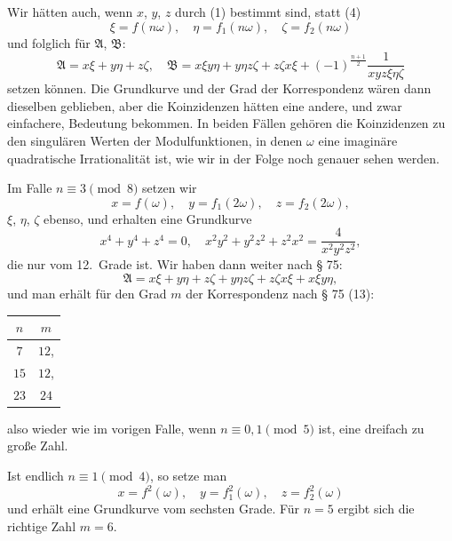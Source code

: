 \documentclass[12pt,a4paper]{article}
\theoremstyle{definition}
\begin{document}
Wir h\"atten auch, wenn $x$, $y$, $z$ durch (1) bestimmt sind,
statt (4)
\begin{equation}\tag{6}
\xi = f(n\omega), \quad \eta = f_1(n\omega), \quad \zeta = f_2(n\omega)
\end{equation}
und folglich f\"ur $\mathfrak{A}$, $\mathfrak{B}$:
\begin{equation}\tag{7}
\mathfrak{A} = x\xi + y\eta + z\zeta, \quad
\mathfrak{B} = x\xi y\eta + y\eta z\zeta + z\zeta x\xi + (-1)^{\frac{n+1}{2}} \frac{1}{xyz\xi\eta\zeta}
\end{equation}
setzen k\"onnen. Die Grundkurve und der Grad der Korrespondenz
w\"aren dann dieselben geblieben, aber die Koinzidenzen h\"atten
eine andere, und zwar einfachere, Bedeutung bekommen. In
beiden F\"allen geh\"oren die Koinzidenzen zu den singul\"aren Werten
der Modulfunktionen, in denen $\omega$ eine imagin\"are quadratische
Irrationalit\"at ist, wie wir in der Folge noch genauer sehen
werden.

Im Falle $n \equiv 3 \pmod{8}$ setzen wir
\begin{equation}\tag{8}
x = f(\omega), \quad y = f_1(2\omega), \quad z = f_2(2\omega),
\end{equation}
$\xi$, $\eta$, $\zeta$ ebenso, und erhalten eine Grundkurve
\begin{equation}\tag{9}
x^4 + y^4 + z^4 = 0, \quad x^2 y^2 + y^2 z^2 + z^2 x^2 = \frac{4}{x^2 y^2 z^2},
\end{equation}
die nur vom 12.~Grade ist. Wir haben dann weiter nach \S{} 75:
\begin{equation*}
\mathfrak{A} = x\xi + y\eta + z\zeta + y\eta z\zeta + z\zeta x\xi + x\xi y\eta,
\end{equation*}
und man erh\"alt f\"ur den Grad $m$ der Korrespondenz nach
\S{} 75 (13):
\begin{center}
\begin{tabular}{c|c}
$n$ & $m$ \\
\hline
$7$ & $12$, \\
$15$ & $12$, \\
$23$ & $24$ \\
\end{tabular}
\end{center}
also wieder wie im vorigen Falle, wenn $n \equiv 0, 1 \pmod{5}$ ist,
eine dreifach zu gro\ss e Zahl.

Ist endlich $n \equiv 1 \pmod{4}$, so setze man
\begin{equation}\tag{10}
x = f^2(\omega), \quad y = f_1^2(\omega), \quad z = f_2^2(\omega)
\end{equation}
und erh\"alt eine Grundkurve vom sechsten Grade.
F\"ur $n = 5$ ergibt sich die richtige Zahl $m = 6$.
\end{document}
